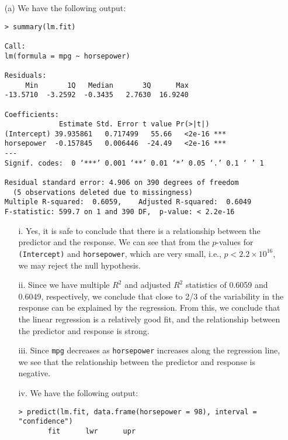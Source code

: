 
\begin{itemize}
    \item[(a)] We have the following output:
        \small\begin{verbatim}
> summary(lm.fit)

Call:
lm(formula = mpg ~ horsepower)

Residuals:
     Min       1Q   Median       3Q      Max 
-13.5710  -3.2592  -0.3435   2.7630  16.9240 

Coefficients:
             Estimate Std. Error t value Pr(>|t|)    
(Intercept) 39.935861   0.717499   55.66   <2e-16 ***
horsepower  -0.157845   0.006446  -24.49   <2e-16 ***
---
Signif. codes:  0 ‘***’ 0.001 ‘**’ 0.01 ‘*’ 0.05 ‘.’ 0.1 ‘ ’ 1

Residual standard error: 4.906 on 390 degrees of freedom
  (5 observations deleted due to missingness)
Multiple R-squared:  0.6059,    Adjusted R-squared:  0.6049 
F-statistic: 599.7 on 1 and 390 DF,  p-value: < 2.2e-16
        \end{verbatim}\normalsize
        \begin{itemize}
            \item[i.] Yes, it is safe to conclude that there is a relationship 
                between the predictor and the response. We can see that from
                the $p$-values for \verb|(Intercept)| and \verb|horsepower|,
                which are very small, i.e., $p < 2.2 \times {10}^{16}$, we may 
                reject the null hypothesis.
            \item[ii.] Since we have multiple $R^2$ and adjusted $R^2$ statistics
                of 0.6059 and 0.6049, respectively, we conclude that close to 2/3
                of the variability in the response can be explained by the regression.
                From this, we conclude that the linear regression is a relatively 
                good fit, and the relationship between the predictor and response
                is strong.
            \item[iii.] Since \verb|mpg| decreases as \verb|horsepower| increases
                along the regression line, we see that the relationship between
                the predictor and response is negative.
            \item[iv.] We have the following output:
                \scriptsize\begin{verbatim}
> predict(lm.fit, data.frame(horsepower = 98), interval = "confidence")
       fit      lwr      upr

\end{verbatim}
\end{itemize}
\end{itemize}
